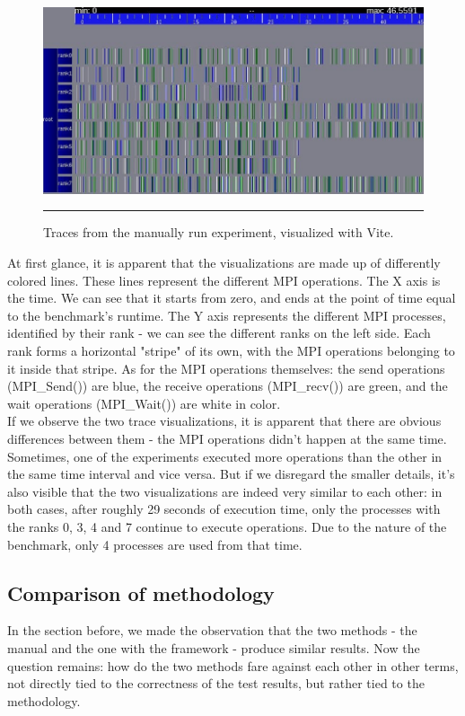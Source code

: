 \begin{figure}[htbp]
  \centering
    \includegraphics[scale=0.7]{./Figures/lu_B_8_manual1.jpg}
    \rule{35em}{0.5pt}
  \caption[Traces from the manually run experiment]{Traces from the
    manually run experiment, visualized with Vite.}
  \label{fig:mex_traces}
\end{figure}

At first glance, it is apparent that the visualizations are made up of
differently colored lines. These lines represent the different MPI
operations. The X axis is the time. We can see that it starts from
zero, and ends at the point of time equal to the benchmark's
runtime. The Y axis represents the different MPI processes, identified
by their rank - we can see the different ranks on the left side. Each
rank forms a horizontal "stripe" of its own, with the MPI operations
belonging to it inside that stripe. As for the MPI operations
themselves: the send operations (MPI\_Send()) are blue, the receive
operations (MPI\_recv()) are green, and the wait operations
(MPI\_Wait()) are white in color.\\[0.3cm]
If we observe the two trace visualizations, it is apparent that there
are obvious differences between them - the MPI operations didn't
happen at the same time. Sometimes, one of the experiments executed
more operations than the other in the same time interval and vice
versa. But if we disregard the smaller details, it's also visible that
the two visualizations are indeed very similar to each other: in both
cases, after roughly 29 seconds of execution time, only the processes
with the ranks 0, 3, 4 and 7 continue to execute operations. Due to
the nature of the benchmark, only 4 processes are used from that time.
\subsection{Comparison of methodology}
In the section before, we made the observation that the two methods -
the manual and the one with the framework - produce similar
results. Now the question remains: how do the two methods fare against
each other in other terms, not directly tied to the correctness of the
test results, but rather tied to the methodology.
